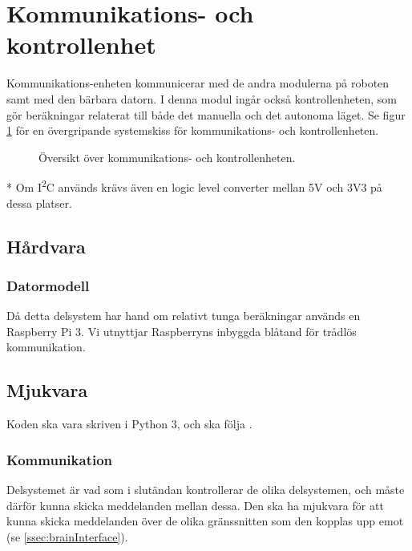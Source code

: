 \documentclass[a4paper,11pt]{article}
\begin{document}
\newpage
\section{Kommunikations- och kontrollenhet} \label{sec:system3}
Kommunikations-enheten kommunicerar med de andra modulerna på roboten samt med den bärbara datorn. I denna modul ingår också kontrollenheten, som gör beräkningar relaterat till både det manuella och det autonoma läget. Se figur \ref{fig:unitBrain} för en övergripande systemskiss för kommunikations- och kontrollenheten.
\begin{figure}[h!]
    \caption{Översikt över kommunikations- och kontrollenheten.  }
    \label{fig:unitBrain}
\end{figure}
\noindent \begin{small}
* Om I\textsuperscript{2}C används krävs även en logic level converter mellan 5V och 3V3 på dessa platser.
\end{small}


\subsection{Hårdvara}

\subsubsection{Datormodell}
Då detta delsystem har hand om relativt tunga beräkningar används en Raspberry Pi 3. Vi utnyttjar Raspberryns inbyggda blåtand för trådlös kommunikation.

\subsection{Mjukvara}
Koden ska vara skriven i Python 3, och ska följa \cite{pep8}.

\subsubsection{Kommunikation}
Delsystemet är vad som i slutändan kontrollerar de olika delsystemen, och måste därför kunna skicka meddelanden mellan dessa. Den ska ha mjukvara för att kunna skicka meddelanden över de olika gränssnitten som den kopplas upp emot (se \ref{ssec:brainInterface}).
\end{document}
